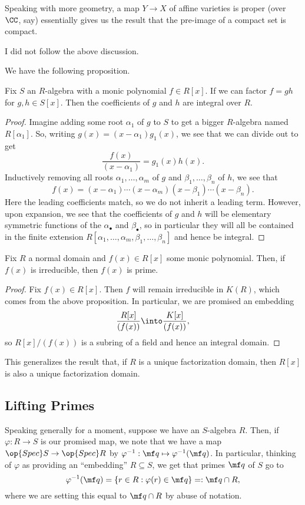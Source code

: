 Speaking with more geometry, a map $Y\to X$ of affine varieties is proper (over $\CC$, say) essentially gives us the result that the pre-image of a compact set is compact.
\begin{remark}
	I did not follow the above discussion.
\end{remark}
We have the following proposition.
\begin{proposition}
	Fix $S$ an $R$-algebra with a monic polynomial $f\in R[x]$. If we can factor $f=gh$ for $g,h\in S[x]$. Then the coefficients of $g$ and $h$ are integral over $R$.
\end{proposition}
\begin{proof}
	Imagine adding some root $\alpha_1$ of $g$ to $S$ to get a bigger $R$-algebra named $R[\alpha_1]$. So, writing $g(x)=(x-\alpha_1)g_1(x)$, we see that we can divide out to get
	\[\frac{f(x)}{(x-\alpha_1)}=g_1(x)h(x).\]
	Inductively removing all roots $\alpha_1,\ldots,\alpha_m$ of $g$ and $\beta_1,\ldots,\beta_n$ of $h$, we see that
	\[f(x)=(x-\alpha_1)\cdots(x-\alpha_m)(x-\beta_1)\cdots(x-\beta_n).\]
	Here the leading coefficients match, so we do not inherit a leading term. However, upon expansion, we see that the coefficients of $g$ and $h$ will be elementary symmetric functions of the $\alpha_\bullet$ and $\beta_\bullet$, so in particular they will all be contained in the finite extension $R[\alpha_1,\ldots,\alpha_m,\beta_1,\ldots,\beta_n]$ and hence be integral.
\end{proof}
\begin{corollary}
	Fix $R$ a normal domain and $f(x)\in R[x]$ some monic polynomial. Then, if $f(x)$ is irreducible, then $f(x)$ is prime.
\end{corollary}
\begin{proof}
	Fix $f(x)\in R[x]$. Then $f$ will remain irreducible in $K(R)$, which comes from the above proposition. In particular, we are promised an embedding
	\[\frac{R[x]}{(f(x))}\into\frac{K[x]}{(f(x))},\]
	so $R[x]/(f(x))$ is a subring of a field and hence an integral domain.
\end{proof}
\begin{remark}
	This generalizes the result that, if $R$ is a unique factorization domain, then $R[x]$ is also a unique factorization domain.
\end{remark}

\subsection{Lifting Primes}
Speaking generally for a moment, suppose we have an $S$-algebra $R$. Then, if $\varphi:R\to S$ is our promised map, we note that we have a map $\op{Spec}S\to\op{Spec}R$ by $\varphi^{-1}:\mf q\mapsto\varphi^{-1}(\mf q)$. In particular, thinking of $\varphi$ as providing an ``embedding'' $R\subseteq S$, we get that primes $\mf q$ of $S$ go to
\[\varphi^{-1}(\mf q)=\{r\in R:\varphi(r)\in\mf q\}=:\mf q\cap R,\]
where we are setting this equal to $\mf q\cap R$ by abuse of notation.

